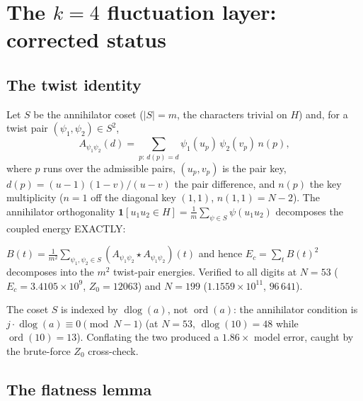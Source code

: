 
\section{The \texorpdfstring{$k=4$}{k=4} fluctuation layer: corrected status}
\label{sec:r95}

\subsection{The twist identity}

Let $S$ be the annihilator coset ($|S| = m$, the characters trivial on
$H$) and, for a twist pair $(\psi_1,\psi_2) \in S^2$,
\[
  A_{\psi_1\psi_2}(d) = \sum_{p:\, d(p) = d} \psi_1(u_p)\,\psi_2(v_p)\,n(p),
\]
where $p$ runs over the admissible pairs, $(u_p,v_p)$ is the pair key,
$d(p) = (u{-}1)(1{-}v)/(u{-}v)$ the pair difference, and $n(p)$ the key
multiplicity ($n = 1$ off the diagonal key $(1,1)$, $n(1,1) = N{-}2$).
The annihilator orthogonality
$\mathbf{1}[u_1u_2 \in H] = \tfrac{1}{m}\sum_{\psi \in S}\psi(u_1u_2)$
decomposes the coupled energy EXACTLY:

\begin{theorem}
\label{thm:twist}
$B(t) = \tfrac{1}{m^2}\sum_{\psi_1,\psi_2 \in S}
(A_{\psi_1\psi_2} \star A_{\psi_1\psi_2})(t)$ and hence
$E_c = \sum_t B(t)^2$ decomposes into the $m^2$ twist-pair energies.
Verified to all digits at $N = 53$ ($E_c = 3.4105 \times 10^9$, $Z_0 =
12063$) and $N = 199$ ($1.1559 \times 10^{11}$, $96\,641$).
\end{theorem}

\begin{remark}
The coset $S$ is indexed by $\operatorname{dlog}(a)$, not
$\operatorname{ord}(a)$: the annihilator condition is
$j \cdot \operatorname{dlog}(a) \equiv 0 \pmod{N-1}$ (at $N = 53$,
$\operatorname{dlog}(10) = 48$ while $\operatorname{ord}(10) = 13$).
Conflating the two produced a $1.86\times$ model error, caught by the
brute-force $Z_0$ cross-check.
\end{remark}

\subsection{The flatness lemma}


